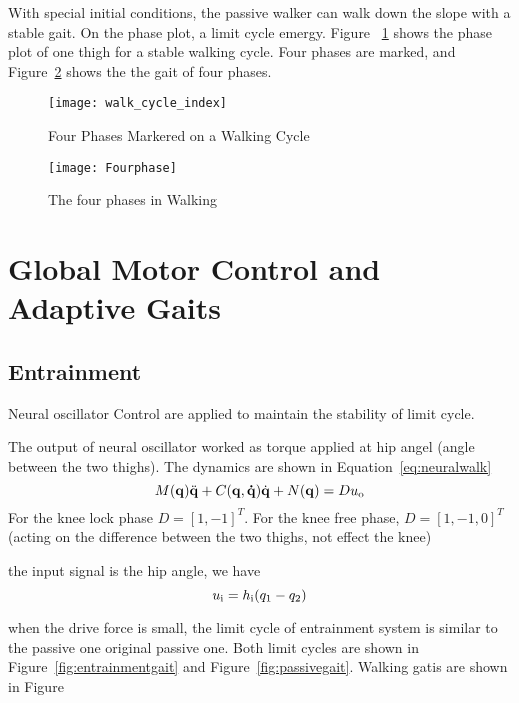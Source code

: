 With special initial conditions, the passive walker can walk down the slope with a stable gait.
On the phase plot,  a limit cycle emergy. 
Figure ~\ref{fig:phasesmaker} shows the phase plot of one thigh for a stable walking cycle.
Four phases are marked, and Figure~\ref{fig:fwalkingphase} shows the the gait of four phases.

\begin{figure}[!htbp]
  \begin{center}
    \texttt{[image: walk\_cycle\_index]}
    \caption{Four Phases Markered on a Walking Cycle}
    \label{fig:phasesmaker}
\end{center}
\end{figure}

\begin{figure}[!htbp]
  \begin{center}
      \texttt{[image: Fourphase]}
    \caption{The four phases in Walking}
    \label{fig:fwalkingphase}
\end{center}
\end{figure}








\section{Global Motor Control and Adaptive Gaits}

\subsection{Entrainment}
Neural oscillator Control  are applied to maintain the stability of limit cycle.

The output of neural oscillator worked as torque applied at hip angel (angle between the two thighs).
The dynamics are shown in Equation~\ref{eq:neuralwalk}
\begin{equation}
\label{eq:neuralwalk}
M(\mathbf{q}) \ddot{\mathbf{q}} + C(\mathbf{q,\dot{q}})\dot{\mathbf{q}} + N(\mathbf{q}) = Du_{\mathrm{o}}
\end{equation}
For the knee lock phase $D=[1,-1]^T$.
For the knee free phase, $D=[1,-1,0]^T$(acting on the difference between the two thighs, not effect the knee)

the input signal is the hip angle,
we have 
\[
	u_{\mathrm{i}}=h_{\mathrm{i}}(q_1-q_2)
\]

when the drive force is small, the limit cycle of entrainment system is similar to the passive one original passive one.
Both limit cycles are shown in Figure~\ref{fig:entrainmentgait} and Figure~\ref{fig:passivegait}.
Walking gatis are shown in Figure




